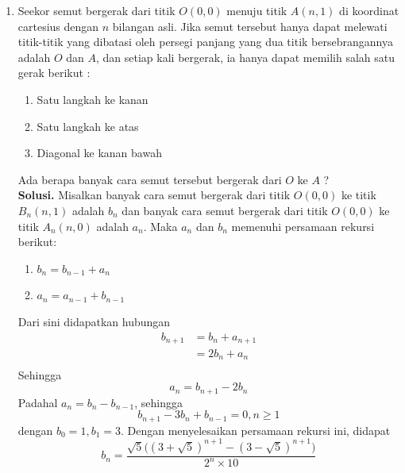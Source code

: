 \documentclass[11pt]{scrartcl}
\begin{document}
\begin{enumerate}
\begin{enumerate}
            Tinjau pula sebaliknya,  bahwa apabila suatu permutasi $f$ dari himpunan $\{1,2,3...,n\}$ dengan $f(i) = n$ ditukar nilainya dengan $n + 1$, kemudian ditambahkan suku $n + 1$ dengan $f(n + 1) = n$, didapatkan suatu permutasi $f$ dari $\{1,2,3,..,n+1\}$ yang memenuhi kasus kedua. Maka, banyak permutasi di kasus ini lebih besar dari sama dengan $x_n$.\\
            Sehingga, banyak permutasi $f$ dalam kasus ini adalah sama dengan $x_n$.
        \end{enumerate}
        Dari kedua kasus tersebut , didapat hubungan rekursi $$x_{n+1} = 2x_n$$ dengan $x_1 = 1$. Maka, $$x_n = 2^{n-1}$$ 
    \item Seekor semut bergerak dari titik $O(0,0)$ menuju titik $A(n,1)$ di koordinat cartesius dengan $n$ bilangan asli. Jika semut tersebut hanya dapat melewati titik-titik yang dibatasi oleh persegi panjang yang dua titik bersebrangannya adalah $O$ dan $A$, dan setiap kali bergerak, ia hanya dapat memilih salah satu gerak berikut :
        \begin{enumerate}
            \item Satu langkah ke kanan
            \item Satu langkah ke atas
            \item Diagonal ke kanan bawah
        \end{enumerate}
        Ada berapa banyak cara semut tersebut bergerak dari $O$ ke $A$ ?\\
        \textbf{Solusi.} Misalkan banyak cara semut bergerak dari titik $O(0,0)$ ke titik $B_n(n,1)$ adalah $b_n$ dan banyak cara semut bergerak dari titik $O(0,0)$ ke titik $A_n(n,0)$ adalah $a_n$. Maka $a_n$ dan $b_n$ memenuhi persamaan rekursi berikut: \\
            \begin{enumerate}
                \item $b_n = b_{n-1} + a_n$
                \item $a_n = a_{n-1} + b_{n-1}$
            \end{enumerate}
        Dari sini didapatkan hubungan 
            \begin{equation*}
                \begin{split}
                    b_{n+1} & = b_n + a_{n+1}\\
                            & = 2b_n + a_n\\  
                \end{split}
            \end{equation*}
        Sehingga $$a_n = b_{n+1} - 2b_n$$
        Padahal $a_n = b_n - b_{n-1}$, sehingga
        $$b_{n+1} - 3b_n + b_{n-1} = 0, n \geq 1$$
        dengan $b_0 = 1, b_1 = 3$. Dengan menyelesaikan persamaan rekursi ini, didapat $$b_n = \dfrac{\sqrt{5}\big((3 + \sqrt{5})^{n+1} - (3 - \sqrt{5})^{n+1}\big)}{2^n \times 10}$$
\end{enumerate}
\end{document}
